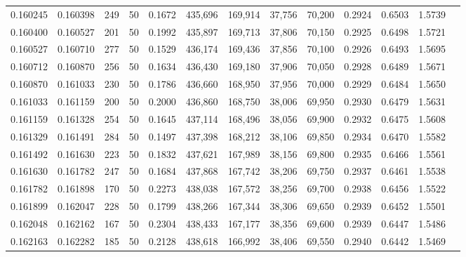 \begin{tabular}{rrrrrrrrrrrrr}
0.160245 & 0.160398 &   249 &  50 &                                     0.1672 & 435,696 & 169,914 &  37,756 &  70,200 & 0.2924 & 0.6503 & 1.5739 \\
0.160400 & 0.160527 &   201 &  50 &                                     0.1992 & 435,897 & 169,713 &  37,806 &  70,150 & 0.2925 & 0.6498 & 1.5721 \\
0.160527 & 0.160710 &   277 &  50 &                                     0.1529 & 436,174 & 169,436 &  37,856 &  70,100 & 0.2926 & 0.6493 & 1.5695 \\
0.160712 & 0.160870 &   256 &  50 &                                     0.1634 & 436,430 & 169,180 &  37,906 &  70,050 & 0.2928 & 0.6489 & 1.5671 \\
0.160870 & 0.161033 &   230 &  50 &                                     0.1786 & 436,660 & 168,950 &  37,956 &  70,000 & 0.2929 & 0.6484 & 1.5650 \\
0.161033 & 0.161159 &   200 &  50 &                                     0.2000 & 436,860 & 168,750 &  38,006 &  69,950 & 0.2930 & 0.6479 & 1.5631 \\
0.161159 & 0.161328 &   254 &  50 &                                     0.1645 & 437,114 & 168,496 &  38,056 &  69,900 & 0.2932 & 0.6475 & 1.5608 \\
0.161329 & 0.161491 &   284 &  50 &                                     0.1497 & 437,398 & 168,212 &  38,106 &  69,850 & 0.2934 & 0.6470 & 1.5582 \\
0.161492 & 0.161630 &   223 &  50 &                                     0.1832 & 437,621 & 167,989 &  38,156 &  69,800 & 0.2935 & 0.6466 & 1.5561 \\
0.161630 & 0.161782 &   247 &  50 &                                     0.1684 & 437,868 & 167,742 &  38,206 &  69,750 & 0.2937 & 0.6461 & 1.5538 \\
0.161782 & 0.161898 &   170 &  50 &                                     0.2273 & 438,038 & 167,572 &  38,256 &  69,700 & 0.2938 & 0.6456 & 1.5522 \\
0.161899 & 0.162047 &   228 &  50 &                                     0.1799 & 438,266 & 167,344 &  38,306 &  69,650 & 0.2939 & 0.6452 & 1.5501 \\
0.162048 & 0.162162 &   167 &  50 &                                     0.2304 & 438,433 & 167,177 &  38,356 &  69,600 & 0.2939 & 0.6447 & 1.5486 \\
0.162163 & 0.162282 &   185 &  50 &                                     0.2128 & 438,618 & 166,992 &  38,406 &  69,550 & 0.2940 & 0.6442 & 1.5469 \\

\end{tabular}
